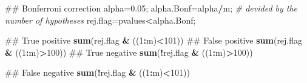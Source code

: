 \documentclass[12pt,]{book}
\newenvironment{Shaded}{\begin{snugshade}}{\end{snugshade}}
\newcommand{\KeywordTok}[1]{\textcolor[rgb]{0.13,0.29,0.53}{\textbf{#1}}}
\newcommand{\DecValTok}[1]{\textcolor[rgb]{0.00,0.00,0.81}{#1}}
\newcommand{\FloatTok}[1]{\textcolor[rgb]{0.00,0.00,0.81}{#1}}
\newcommand{\StringTok}[1]{\textcolor[rgb]{0.31,0.60,0.02}{#1}}
\newcommand{\CommentTok}[1]{\textcolor[rgb]{0.56,0.35,0.01}{\textit{#1}}}
\newcommand{\OperatorTok}[1]{\textcolor[rgb]{0.81,0.36,0.00}{\textbf{#1}}}
\newcommand{\NormalTok}[1]{#1}
\begin{document}
\begin{Shaded}
\begin{Highlighting}[]
\NormalTok{## Bonferroni correction }
\NormalTok{alpha=}\FloatTok{0.05}\NormalTok{;}
\NormalTok{alpha.Bonf=alpha}\OperatorTok{/}\NormalTok{m; }\CommentTok{# devided by the number of hypotheses}
\NormalTok{rej.flag=pvalues}\OperatorTok{<}\NormalTok{alpha.Bonf;}

\NormalTok{## True positive}
\KeywordTok{sum}\NormalTok{(rej.flag }\OperatorTok{&}\StringTok{ }\NormalTok{((}\DecValTok{1}\OperatorTok{:}\NormalTok{m)}\OperatorTok{<}\DecValTok{101}\NormalTok{))}
\NormalTok{## False positive }
\KeywordTok{sum}\NormalTok{(rej.flag }\OperatorTok{&}\StringTok{ }\NormalTok{((}\DecValTok{1}\OperatorTok{:}\NormalTok{m)}\OperatorTok{>}\DecValTok{100}\NormalTok{))}
\NormalTok{## True negative}
\KeywordTok{sum}\NormalTok{(}\OperatorTok{!}\NormalTok{rej.flag }\OperatorTok{&}\StringTok{ }\NormalTok{((}\DecValTok{1}\OperatorTok{:}\NormalTok{m)}\OperatorTok{>}\DecValTok{100}\NormalTok{))}

\NormalTok{## False negative}
\KeywordTok{sum}\NormalTok{(}\OperatorTok{!}\NormalTok{rej.flag }\OperatorTok{&}\StringTok{ }\NormalTok{((}\DecValTok{1}\OperatorTok{:}\NormalTok{m)}\OperatorTok{<}\DecValTok{101}\NormalTok{))}
\end{Highlighting}
\end{Shaded}
\end{document}
